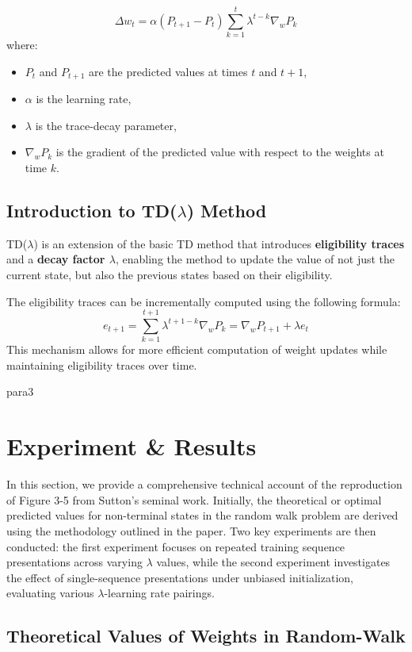 \documentclass[lettersize,journal]{IEEEtran}
\begin{document}
\[
\Delta w_t = \alpha (P_{t+1} - P_t) \sum_{k=1}^{t} \lambda^{t-k} \nabla_w P_k
\]
where:
\begin{itemize}
    \item \(P_t\) and \(P_{t+1}\) are the predicted values at times \(t\) and \(t+1\),
    \item \(\alpha\) is the learning rate,
    \item \(\lambda\) is the trace-decay parameter,
    \item \(\nabla_w P_k\) is the gradient of the predicted value with respect to the weights at time \(k\).
\end{itemize}

\subsection{Introduction to TD(\!$\lambda$) Method}
TD(\!$\lambda$) is an extension of the basic TD method that introduces \textbf{eligibility traces} and a \textbf{decay factor \!$\lambda$}, enabling the method to update the value of not just the current state, but also the previous states based on their eligibility.

The eligibility traces can be incrementally computed using the following formula:
\[
e_{t+1} = \sum_{k=1}^{t+1} \lambda^{t+1-k} \nabla_w P_k = \nabla_w P_{t+1} + \lambda e_t
\]
This mechanism allows for more efficient computation of weight updates while maintaining eligibility traces over time.



para3

\section{Experiment \& Results}
In this section, we provide a comprehensive technical account of the reproduction of Figure 3-5 from Sutton's seminal work. Initially, the theoretical or optimal predicted values for non-terminal states in the random walk problem are derived using the methodology outlined in the paper. Two key experiments are then conducted: the first experiment focuses on repeated training sequence presentations across varying \(\lambda\) values, while the second experiment investigates the effect of single-sequence presentations under unbiased initialization, evaluating various \(\lambda\)-learning rate pairings.

\subsection{Theoretical Values of Weights in Random-Walk}
\end{document}
